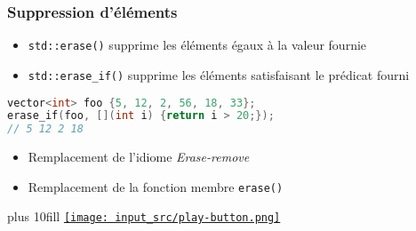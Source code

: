 \documentclass[C++.tex]{subfiles}
\begin{document}
\begin{frame}[fragile]
	\frametitle{Suppression d'éléments}
	\begin{itemize}
		\item \lstinline|std::erase()| supprime les éléments égaux à la valeur fournie
		\item \lstinline|std::erase_if()| supprime les éléments satisfaisant le prédicat fourni
	\end{itemize}

	\begin{lstlisting}[language=C++]
vector<int> foo {5, 12, 2, 56, 18, 33};
erase_if(foo, [](int i) {return i > 20;});
// 5 12 2 18\end{lstlisting}

	\begin{itemize}
		\item Remplacement de l'idiome \og \textit{Erase-remove}\fg{} 
		\item Remplacement de la fonction membre \lstinline|erase()|
	\end{itemize}

	\vskip 10mm plus 10fill
	\hfill
	\href{https://godbolt.org/#g:!((g:!((g:!((h:codeEditor,i:(filename:'1',fontScale:14,fontUsePx:'0',j:1,lang:c%2B%2B,selection:(endColumn:1,endLineNumber:26,positionColumn:1,positionLineNumber:26,selectionStartColumn:1,selectionStartLineNumber:26,startColumn:1,startLineNumber:26),source:'%23include+%3Cvector%3E%0A%23include+%3Cmap%3E%0A%23include+%3Cstring%3E%0A%23include+%3Ciostream%3E%0A%0Aint+main()%0A%7B%0A++std::vector%3Cint%3E+foo+%7B5,+12,+2,+56,+18,+33%7D%3B%0A++std::erase_if(foo,+%5B%5D(int+i)+%7Breturn+i+%3E+20%3B%7D)%3B%0A%0A++for(int+i+:+foo)%0A++%7B%0A++++std::cout+%3C%3C+i+%3C%3C+%22+%22%3B%0A++%7D%0A++std::cout+%3C%3C+%22%5Cn%22%3B%0A%0A++std::map%3Cint,+std::string%3E+bar%7B%7B5,+%22a%22%7D,+%7B12,+%22b%22%7D,+%7B2,+%22c%22%7D,+%7B42,+%22d%22%7D%7D%3B%0A++std::erase_if(bar,+%5B%5D(std::pair%3Cint,+std::string%3E+i)+%7Breturn+i.first+%3E+20%3B%7D)%3B%0A%0A++for(auto+i+:+bar)%0A++%7B%0A++++std::cout+%3C%3C+i.first+%3C%3C+%22+:+%22+%3C%3C+i.second+%3C%3C+%22+%22%3B%0A++%7D%0A++std::cout+%3C%3C+%22%5Cn%22%3B%0A%7D%0A'),l:'5',n:'0',o:'C%2B%2B+source+%231',t:'0')),k:50,l:'4',n:'0',o:'',s:0,t:'0'),(g:!((h:executor,i:(argsPanelShown:'1',compilationPanelShown:'0',compiler:g112,compilerOutShown:'0',execArgs:'',execStdin:'',fontScale:14,fontUsePx:'0',j:1,lang:c%2B%2B,libs:!((name:boost,ver:'175')),options:'-std%3Dc%2B%2B20',source:1,stdinPanelShown:'1',tree:'1',wrap:'0'),l:'5',n:'0',o:'Executor+x86-64+gcc+11.2+(C%2B%2B,+Editor+%231)',t:'0')),header:(),k:50,l:'4',n:'0',o:'',s:0,t:'0')),l:'2',n:'0',o:'',t:'0')),version:4}{\texttt{[image: input\_src/play-button.png]}}
\end{frame}
\end{document}
